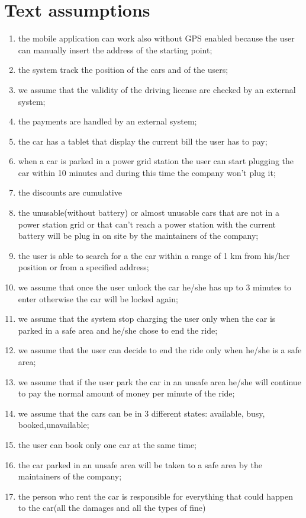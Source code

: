 \section{Text assumptions}
\begin{enumerate}
	\item the mobile application can work also without GPS enabled because the user can manually insert the address of the starting point;
	\item the system track the position of the cars and of the users;
	\item we assume that the validity of the driving license are checked by an external system;
	\item the payments are handled by an external system;
	\item the car has a tablet that display the current bill the user has to pay;
	\item when a car is parked in a power grid station the user can start plugging the car within 10 minutes and during this time the company won't plug it;
	\item the discounts are cumulative
	\item the unusable(without battery) or almost unusable cars that are not in a power station grid or that can't reach a power station with the current battery will be plug in on site by the maintainers of the company;
	\item the user is able to search for a the car within a range of 1 km from his/her position or from a specified address;
	\item we assume that once the user unlock the car he/she has up to 3 minutes to enter otherwise the car will be locked again;
	\item we assume that the system stop charging the user only when the car is parked in a safe area and he/she chose to end the ride;
	\item we assume that the user can decide to end the ride only when he/she is a safe area;
	\item we assume that if the user park the car in an unsafe area he/she will continue to pay the normal amount of money per minute of the ride;
	\item we assume that the cars can be in 3 different states: available, busy, booked,unavailable;
	\item the user can book only one car at the same time;
	\item the car parked in an unsafe area will be taken to a safe area by the maintainers of the company;
	\item the person who rent the car is responsible for everything that could happen to the car(all the damages and all the types of fine)

\end{enumerate}
